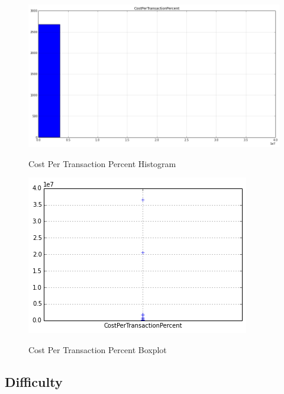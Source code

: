 \begin{figure}[bth]
  \myfloatalign
  {\includegraphics[width=1\linewidth]
    {gfx/cost-per-transaction-percent-histogram}}
  \caption{Cost Per Transaction Percent Histogram}
  \label{fig:cost-per-transaction-percent-histogram}
\end{figure}

\begin{figure}[bth]
  \myfloatalign
  {\includegraphics[width=1\linewidth]
    {gfx/cost-per-transaction-percent-boxplot}}
  \caption{Cost Per Transaction Percent Boxplot}
  \label{fig:cost-per-transaction-percent-boxplot}
\end{figure}

\clearpage

\subsection{Difficulty}
\label{sec:difficulty}

